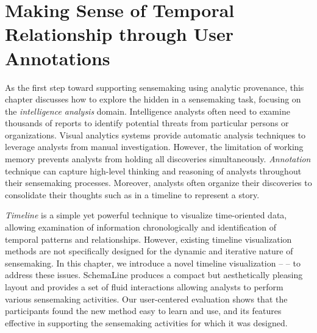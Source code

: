 \chapter{Making Sense of Temporal Relationship through User Annotations}
\label{chap:schemaline}

\graphicspath{{Chapter3/figures/}}

As the first step toward supporting sensemaking using analytic provenance, this chapter discusses how to explore the hidden  in a sensemaking task, focusing on the \emph{intelligence analysis} domain. Intelligence analysts often need to examine thousands of reports to identify potential threats from particular persons or organizations. Visual analytics systems provide automatic analysis techniques to leverage analysts from manual investigation. However, the limitation of working memory prevents analysts from holding all discoveries simultaneously. \emph{Annotation} technique can capture high-level thinking and reasoning of analysts throughout their sensemaking processes. Moreover, analysts often organize their discoveries to consolidate their thoughts such as in a timeline to represent a story.

\emph{Timeline} is a simple yet powerful technique to visualize time-oriented data, allowing examination of information chronologically and identification of temporal patterns and relationships. However, existing timeline visualization methods are not specifically designed for the dynamic and iterative nature of sensemaking. In this chapter, we introduce a novel timeline visualization -- \emph{} -- to address these issues. SchemaLine produces a compact but aesthetically pleasing layout and provides a set of fluid interactions allowing analysts to perform various sensemaking activities. Our user-centered evaluation shows that the participants found the new method easy to learn and use, and its features effective in supporting the sensemaking activities for which it was designed.






